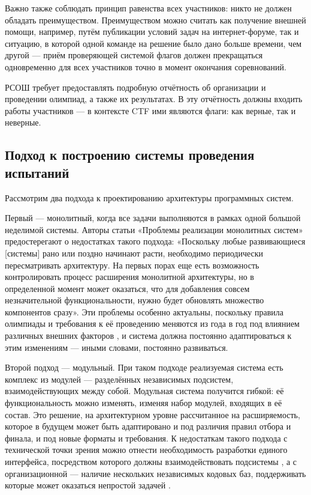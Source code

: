 Важно также соблюдать принцип равенства всех участников: никто не должен обладать преимуществом. Преимуществом можно считать как получение внешней помощи, например, путём публикации условий задач на интернет-форуме, так и ситуацию, в которой одной команде на решение было дано больше времени, чем другой — приём проверяющей системой флагов должен прекращаться одновременно для всех участников точно в момент окончания соревнований.

РСОШ требует предоставлять подробную отчётность об организации и проведении олимпиад, а также их результатах. В эту отчётность должны входить работы участников — в контексте CTF ими являются флаги: как верные, так и неверные.

\subsection{Подход к построению системы проведения испытаний}

Рассмотрим два подхода к проектированию архитектуры программных систем.

Первый — монолитный, когда все задачи выполняются в рамках одной большой неделимой системы. Авторы статьи «Проблемы реализации монолитных систем» \cite{Fomin21} предостерегают о недостатках такого подхода: «Поскольку любые развивающиеся [системы] рано или поздно начинают расти, необходимо периодически пересматривать архитектуру. На первых порах еще есть возможность контролировать процесс расширения монолитной архитектуры, но в определенной момент может оказаться, что для добавления совсем незначительной функциональности, нужно будет обновлять множество компонентов сразу». Эти проблемы особенно актуальны, поскольку правила олимпиады и требования к её проведению меняются из года в год под влиянием различных внешних факторов \cite{Olymp20} \cite{Olymp}, и система должна постоянно адаптироваться к этим изменениям — иными словами, постоянно развиваться.

Второй подход — модульный. При таком подходе реализуемая система есть комплекс из модулей — разделённых независимых подсистем, взаимодействующих между собой. Модульная система получится гибкой: её функциональность можно изменять, изменяя набор модулей, входящих в её состав. Это решение, на архитектурном уровне рассчитанное на расширяемость, которое в будущем может быть адаптировано и под различия правил отбора и финала, и под новые форматы и требования. К недостаткам такого подхода с технической точки зрения можно отнести необходимость разработки единого интерфейса, посредством которого должны взаимодействовать подсистемы \cite{Parnas85}, а с организационной — наличие нескольких независимых кодовых баз, поддерживать которые может оказаться непростой задачей \cite{Fomin21}.

